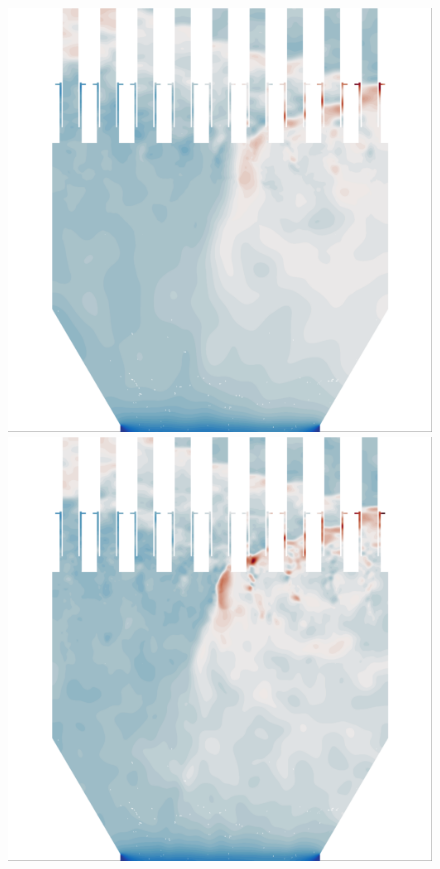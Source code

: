 \begin{figure}
	\begin{minipage}{0.45\linewidth}
		\includegraphics[width=0.99\linewidth,trim={0.5em 0.5em 0.5cm 0.5em},clip]{Chapters/HPROMResults/Images/nineElem/unsampled/k40/samp100p/UnsteadyFieldResults/Images/fig_z_Static_Pressure_4378.png}
	\end{minipage}
	\begin{minipage}{0.45\linewidth}
		\includegraphics[width=0.99\linewidth,trim={0.5em 0.5em 0.5cm 0.5em},clip]{Chapters/HPROMResults/Images/nineElem/unsampled/k80/samp100p/UnsteadyFieldResults/Images/fig_z_Static_Pressure_4378.png}

\end{minipage}
\end{figure}
